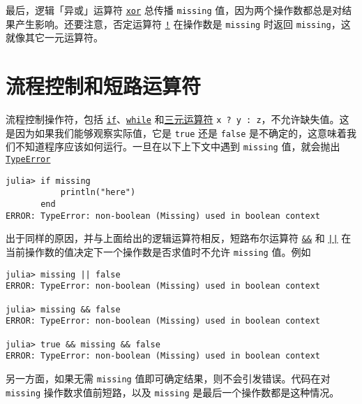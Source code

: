 最后，逻辑「异或」运算符 \hyperlink{7071880015536674935}{\texttt{xor}} 总传播 \texttt{missing} 值，因为两个操作数都总是对结果产生影响。还要注意，否定运算符 \hyperlink{4329035214952292986}{\texttt{!}} 在操作数是 \texttt{missing} 时返回 \texttt{missing}，这就像其它一元运算符。



\hypertarget{354241034752728129}{}


\section{流程控制和短路运算符}



流程控制操作符，包括 \hyperlink{11624168233949720742}{\texttt{if}}、\hyperlink{15133348314455964692}{\texttt{while}} 和\hyperlink{14451148373001501733}{三元运算符} \texttt{x ? y : z}，不允许缺失值。这是因为如果我们能够观察实际值，它是 \texttt{true} 还是 \texttt{false} 是不确定的，这意味着我们不知道程序应该如何运行。一旦在以下上下文中遇到 \texttt{missing} 值，就会抛出 \hyperlink{2622693721821893139}{\texttt{TypeError}}




\begin{verbatim}
julia> if missing
           println("here")
       end
ERROR: TypeError: non-boolean (Missing) used in boolean context
\end{verbatim}



出于同样的原因，并与上面给出的逻辑运算符相反，短路布尔运算符 \hyperlink{4714012140247170866}{\texttt{\&\&}} 和 \hyperlink{2053797086840563251}{\texttt{||}} 在当前操作数的值决定下一个操作数是否求值时不允许 \texttt{missing} 值。例如




\begin{verbatim}
julia> missing || false
ERROR: TypeError: non-boolean (Missing) used in boolean context

julia> missing && false
ERROR: TypeError: non-boolean (Missing) used in boolean context

julia> true && missing && false
ERROR: TypeError: non-boolean (Missing) used in boolean context
\end{verbatim}



另一方面，如果无需 \texttt{missing} 值即可确定结果，则不会引发错误。代码在对 \texttt{missing} 操作数求值前短路，以及 \texttt{missing} 是最后一个操作数都是这种情况。




